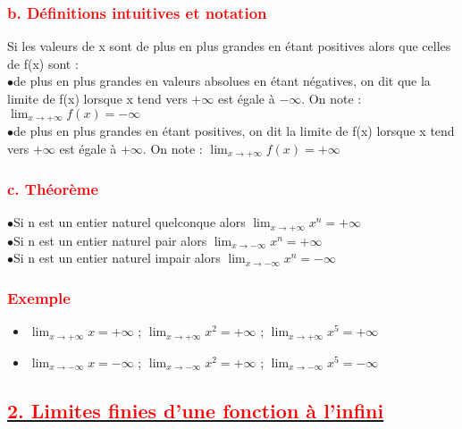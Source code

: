 \documentclass[12pt]{article}
\begin{document}
\subsubsection*{\textcolor{red}{b. Définitions intuitives et notation}}
Si les valeurs de x sont de plus en plus grandes en étant positives alors que celles de f(x) sont :\\
$\bullet$de plus en plus grandes en valeurs absolues en étant négatives, on dit que la limite de
f(x) lorsque x tend vers $+\infty$ est égale à $-\infty$. On note :\\ 
$\lim_{x \to +\infty}f(x)=-\infty$\\
$\bullet$de plus en plus grandes en étant positives, on dit la limite de f(x) lorsque x tend vers $+\infty$ est égale à $+\infty$. On note : $\lim_{x \to +\infty}f(x)=+\infty$\\

\subsubsection*{\textcolor{red}{c. Théorème}}
$\bullet$Si n est un entier naturel quelconque alors $\lim_{x \to +\infty}x^{n}=+\infty$\\
$\bullet$Si n est un entier naturel pair alors $\lim_{x \to -\infty}x^{n}=+\infty$\\
$\bullet$Si n est un entier naturel impair alors $\lim_{x \to -\infty}x^{n}=-\infty$\\
\subsubsection*{\textcolor{red}{Exemple}}
\begin{itemize}
\item $\lim_{x \to +\infty}x=+\infty$ ; $\lim_{x \to +\infty}x^{2}=+\infty$ ; 
$\lim_{x \to +\infty}x^{5}=+\infty$\\
\item $\lim_{x \to -\infty}x=-\infty$ ; $\lim_{x \to -\infty}x^{2}=+\infty$ ; 
$\lim_{x \to -\infty}x^{5}=-\infty$
\end{itemize}
\subsection*{\underline{\textbf{\textcolor{red}{2. Limites finies d’une fonction à l’infini}}}}
\end{document}
